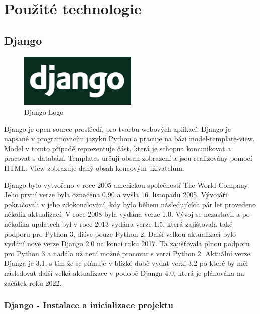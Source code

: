 \chapter{Použité technologie}
\label{2-technologie}

\section{Django}

\begin{figure}[H] \centering
    \includegraphics[width=160pt]{./pictures/django-logo.png}
    \caption[Django Logo]{Django Logo \cite{}}
	\label{fig:Django Logo}                                
\end{figure}

Django je open source prostředí, pro tvorbu webových aplikací. Django
je napsané v programovacím jazyku Python a pracuje na bázi
model-template-view. Model v tomto případě reprezentuje část, která je
schopna komunikovat a pracovat s databází. Templates určují obsah
zobrazení a jsou realizovány pomocí HTML. View zobrazuje daný obsah
koncovým uživatelům.

Django bylo vytvořeno v roce 2005 americkou společností The World
Company. Jeho první verze byla označena 0.90 a vyšla 16. listopadu
2005. Vývojáři pokračovali v jeho zdokonalování, kdy bylo během
následujících pár let provedeno několik aktualizací. V roce 2008 byla
vydána verze 1.0. Vývoj se nezastavil a po několika updatech byl v
roce 2013 vydána verze 1.5, která zajišťovala také podporu pro
Python 3, dříve pouze Python 2. Další velkou aktualizací bylo vydání nové
verze Django 2.0 na konci roku 2017. Ta zajišťovala plnou podporu pro
Python 3 a nadála už není možné pracovat s verzí Python 2. Aktuální
verze Djanga je 3.1, s tím že se plánuje v blízké době vydat verzi 3.2
po které by měl následovat další velká aktualizace v podobě Djanga 4.0,
která je plánována na začátek roku 2022.

\newpage


\subsection{Django - Instalace a inicializace projektu}

